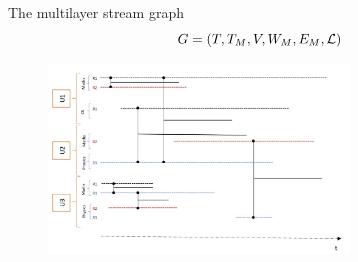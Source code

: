\documentclass[15pt]{beamer}
\begin{document}
\begin{frame}{The multilayer stream graph}
\[
G=(T,T_M,V,W_M,E_M,\cal{L})
\]

\begin{figure}
    \centering
    \includegraphics[width=8cm]{img/chercheurs.jpg}
    \label{fig:chercheurs}
\end{figure}
\end{frame}
\end{document}
